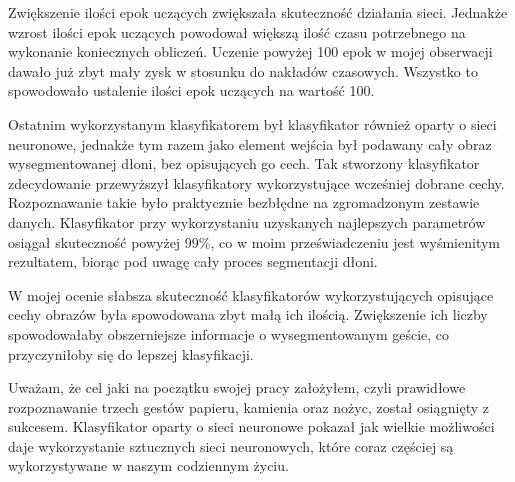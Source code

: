 \documentclass[a4paper,12pt,twoside,openany]{report}
\begin{document}
	Zwiększenie ilości epok uczących zwiększała skuteczność działania sieci. Jednakże wzrost ilości epok uczących powodował większą ilość czasu potrzebnego na wykonanie koniecznych obliczeń. Uczenie powyżej 100 epok w mojej obserwacji dawało już zbyt mały zysk w stosunku do nakładów czasowych. Wszystko to spowodowało ustalenie ilości epok uczących na wartość 100.

	Ostatnim wykorzystanym klasyfikatorem był klasyfikator również oparty o sieci neuronowe, jednakże tym razem jako element wejścia był podawany cały obraz wysegmentowanej dłoni, bez opisujących go cech. Tak stworzony klasyfikator zdecydowanie przewyższył klasyfikatory wykorzystujące wcześniej dobrane cechy. Rozpoznawanie takie było praktycznie bezbłędne na zgromadzonym zestawie danych. Klasyfikator przy wykorzystaniu uzyskanych najlepszych parametrów osiągał skuteczność powyżej 99\%, co w moim przeświadczeniu jest wyśmienitym rezultatem, biorąc pod uwagę cały proces segmentacji dłoni.
	 
	W mojej ocenie słabsza skuteczność klasyfikatorów wykorzystujących opisujące cechy obrazów była spowodowana zbyt małą ich ilością. Zwiększenie ich liczby spowodowałaby obszerniejsze informacje o wysegmentowanym geście, co przyczyniłoby się do lepszej klasyfikacji. 
	
	Uważam, że cel jaki na początku swojej  pracy założyłem, czyli prawidłowe rozpoznawanie trzech gestów papieru, kamienia oraz nożyc, został osiągnięty z sukcesem. Klasyfikator oparty o sieci neuronowe pokazał jak wielkie możliwości daje wykorzystanie sztucznych sieci neuronowych, które coraz częściej są wykorzystywane w naszym codziennym życiu.
	
\end{document}
